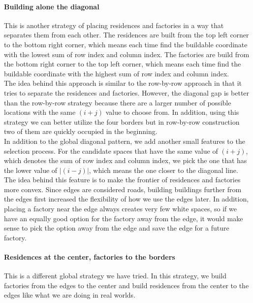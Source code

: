 \paragraph{Building alone the diagonal}
This is another strategy of placing residences and factories in a way that separates them from each other. The residences are built from the top left corner to the bottom right corner, which means each time find the buildable coordinate with the lowest sum of row index and column index. The factories are build from the bottom right corner to the top left corner, which means each time find the buildable coordinate with the highest sum of row index and column index.\\

The idea behind this approach is similar to the row-by-row approach in that it tries to separate the residences and factories. However, the diagonal gap is better than the row-by-row strategy because there are a larger number of possible locations with the same $(i+j)$ value to choose from. In addition, using this strategy we can better utilize the four borders but in row-by-row construction two of them are quickly occupied in the beginning.\\

In addition to the global diagonal pattern, we add another small features to the selection process. For the candidate spaces that have the same value of $(i+j)$, which denotes the sum of row index and column index, we pick the one that has the lower value of $|(i-j)|$, which means the one closer to the diagonal line. The idea behind this feature is to make the frontier of residences and factories more convex. Since edges are considered roads, building buildings further from the edges first increased the flexibility of how we use the edges later. In addition, placing a factory near the edge always creates very few white spaces, so if we have an equally good option for the factory away from the edge, it would make sense to pick the option away from the edge and save the edge for a future factory.

\paragraph{Residences at the center, factories to the borders}
This is a different global strategy we have tried. In this strategy, we build factories from the edges to the center and build residences from the center to the edges like what we are doing in real worlds. 

